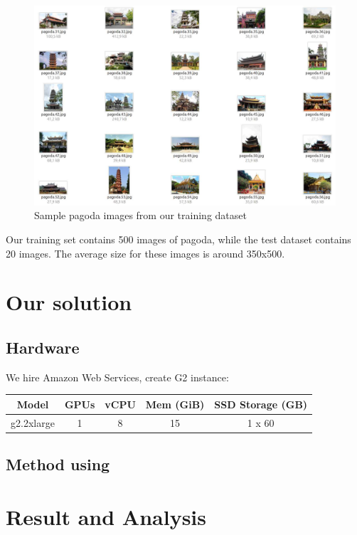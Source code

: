 \documentclass[11pt]{article}
\begin{document}
\begin{figure}[H]
\centering
\includegraphics[width=1\textwidth]{images/sample.jpg}
\caption{Sample pagoda images from our training dataset}
\label{fig:samplepagoda}
\end{figure}
Our training set contains 500 images of pagoda, while the test dataset contains 20 images. The average size for these images is around 350x500.

\section{Our solution}
\subsection{Hardware}
We hire Amazon Web Services, create G2 instance:
\begin{center}
\begin{tabular}{| c | c | c | c | c |}
\hline
 Model & GPUs & vCPU & Mem (GiB) & SSD Storage (GB) \\ 
\hline
 g2.2xlarge & 1 & 8 & 15 & 1 x 60  \\
\hline
\end{tabular}
\end{center}

\subsection{Method using}

\section{Result and Analysis}






\end{document}
